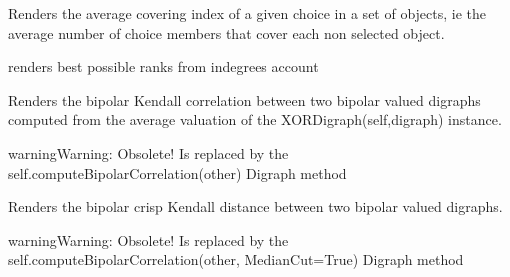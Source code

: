 \documentclass[letterpaper,10pt,english]{sphinxmanual}
\begin{document}
\begin{fulllineitems}
\begin{fulllineitems}
\end{fulllineitems}


\begin{fulllineitems}
\label{techDoc:digraphs.Digraph.averageCoveringIndex}
Renders the average covering index of a given choice in a set of objects,
ie the average number of choice members that cover each
non selected object.

\end{fulllineitems}


\begin{fulllineitems}
\label{techDoc:digraphs.Digraph.bestRanks}
renders best possible ranks from indegrees account

\end{fulllineitems}


\begin{fulllineitems}
\label{techDoc:digraphs.Digraph.bipolarKCorrelation}
Renders the bipolar Kendall correlation between two bipolar valued
digraphs computed from the average valuation of the
XORDigraph(self,digraph) instance.

\begin{notice}{warning}{Warning:}
Obsolete! Is replaced by the self.computeBipolarCorrelation(other) Digraph method
\end{notice}

\end{fulllineitems}


\begin{fulllineitems}
\label{techDoc:digraphs.Digraph.bipolarKDistance}
Renders the bipolar crisp Kendall distance between two bipolar valued
digraphs.

\begin{notice}{warning}{Warning:}
Obsolete! Is replaced by the self.computeBipolarCorrelation(other, MedianCut=True) Digraph method
\end{notice}


\end{fulllineitems}
\end{fulllineitems}
\end{document}
